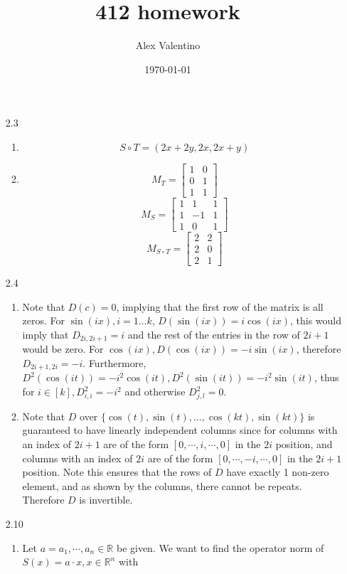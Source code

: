 \documentclass[12pt, letterpaper]{article}
\date{\today}
\author{Alex Valentino}
\title{412 homework}
\newcommand{\R}{\mathbb{R}}
\begin{document}
\begin{enumerate}
	\item[2.3]
	\begin{enumerate}
		\item 
		$$S \circ T = 
		(2x+2y, 2x, 2x+y)$$
		\item 
		$$M_T = \begin{bmatrix}
		1 & 0\\ 0 & 1\\ 1 & 1
		\end{bmatrix}$$
		$$
		M_S = \begin{bmatrix}
			1 & 1 & 1\\
			1 & - 1 & 1\\
			1 & 0 & 1
\end{bmatrix}				
		$$
		$$
		M_{S \circ T} = 	
		\begin{bmatrix}
		2 & 2\\ 2 & 0\\ 2 & 1
\end{bmatrix}			
		$$
	\end{enumerate}
	\item[2.4]
	\begin{enumerate}
		\item Note that $D(c) = 0$, implying that the first row 
		of the matrix is all zeros.  For $\sin(ix), i = 1\ldots k$, 
		$D(\sin(ix)) = i\cos(ix)$, this would imply that 
		${D_{2i,2i+1}} = i$ and the rest of the entries in the row 
		of $2i+1$ would be zero.  For $\cos(ix), D(\cos(ix)) = -i\sin(ix)$, therefore $D_{2i+1,2i} = -i$.  Furthermore, 
		$D^2(\cos(it)) = -i^2 \cos(it), D^2(\sin(it)) = -i^2 \sin(it)$,
		thus for $i \in [k], D^2_{i,i} = -i^2$ and otherwise 
		$D^2_{j,l} = 0$.  	
		\item Note that $D$ over $\{\cos(t),\sin(t),\ldots,\cos(kt),
		\sin(kt)\}$ is 
		guaranteed to have linearly independent columns since for 
		columns with an index of $2i+1$ are of the form 
		$[0,\cdots,i,\cdots,0]$ in the $2i$ position, and 
		columns with an index of $2i$ are of the form 
		$[0,\cdots,-i,\cdots,0]$ in the $2i+1$ position.  Note this 
		ensures that the rows of $D$ have exactly 1 non-zero element,
		and as shown by the columns, there cannot be repeats.  
		Therefore $D$ is invertible.  
	\end{enumerate}
	\item[2.10]
	\begin{enumerate}
		\item Let $a = a_1,\cdots,a_n \in \R$ be given.  We want to find 
		the operator norm of $S(x) = a \cdot x, x \in \R^n$ with 

\end{enumerate}
\end{enumerate}
\end{document}
